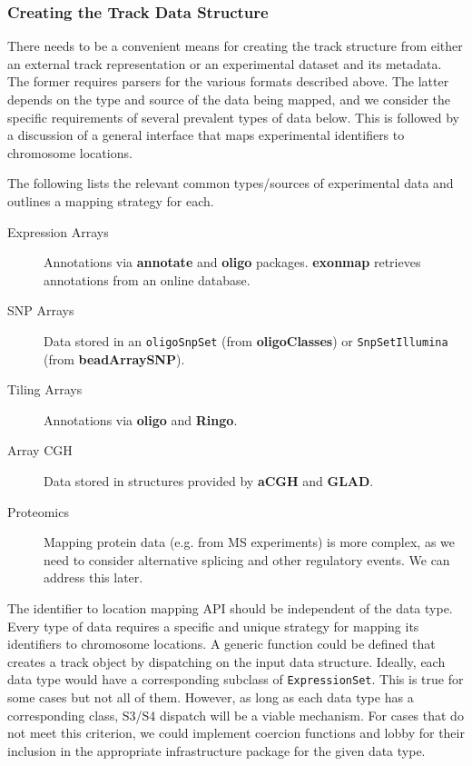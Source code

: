 \documentclass{article}
\begin{document}
\subsubsection*{Creating the Track Data Structure}
\label{sec:creation}

There needs to be a convenient means for creating the track structure
from either an external track representation or an experimental
dataset and its metadata. The former requires parsers for the various
formats described above. The latter depends on the
type and source of the data being mapped, and we consider the specific
requirements of several prevalent types of data below. This is
followed by a discussion of a general interface that maps experimental
identifiers to chromosome locations.

The following lists the relevant common types/sources of experimental
data and outlines a mapping strategy for each.
\begin{description}
\item[Expression Arrays] Annotations via \textbf{annotate} and
  \textbf{oligo} packages. \textbf{exonmap}
  retrieves annotations from an online database.
\item[SNP Arrays] Data stored in an \texttt{oligoSnpSet} (from 
\textbf{oligoClasses}) or \texttt{SnpSetIllumina} (from
\textbf{beadArraySNP}).
\item[Tiling Arrays] Annotations via \textbf{oligo} and
\textbf{Ringo}.
\item[Array CGH] Data stored in structures provided by \textbf{aCGH}
and \textbf{GLAD}.
\item[Proteomics] Mapping protein data (e.g. from MS experiments) is
more complex, as we need to consider alternative splicing and other
regulatory events. We can address this later.
\end{description}

The identifier to location mapping API should be independent of the
data type. Every type of data requires a specific and unique strategy
for mapping its identifiers to chromosome locations. A generic
function could be defined that creates a track object by dispatching
on the input data structure.  Ideally, each data type would have a
corresponding subclass of \texttt{ExpressionSet}. This is true for
some cases but not all of them. However, as long as each data type has
a corresponding class, S3/S4 dispatch will be a viable mechanism. For
cases that do not meet this criterion, we could implement coercion
functions and lobby for their inclusion in the appropriate
infrastructure package for the given data type.
\end{document}
